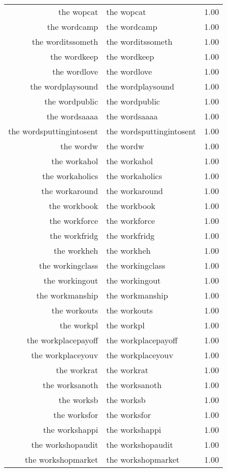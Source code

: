 \begin{table}[ht]
\begin{tabular}{rlr}
  the wopcat & the wopcat & 1.00 \\ 
  the wordcamp & the wordcamp & 1.00 \\ 
  the worditssometh & the worditssometh & 1.00 \\ 
  the wordkeep & the wordkeep & 1.00 \\ 
  the wordlove & the wordlove & 1.00 \\ 
  the wordplaysound & the wordplaysound & 1.00 \\ 
  the wordpublic & the wordpublic & 1.00 \\ 
  the wordsaaaa & the wordsaaaa & 1.00 \\ 
  the wordsputtingintosent & the wordsputtingintosent & 1.00 \\ 
  the wordw & the wordw & 1.00 \\ 
  the workahol & the workahol & 1.00 \\ 
  the workaholics & the workaholics & 1.00 \\ 
  the workaround & the workaround & 1.00 \\ 
  the workbook & the workbook & 1.00 \\ 
  the workforce & the workforce & 1.00 \\ 
  the workfridg & the workfridg & 1.00 \\ 
  the workheh & the workheh & 1.00 \\ 
  the workingclass & the workingclass & 1.00 \\ 
  the workingout & the workingout & 1.00 \\ 
  the workmanship & the workmanship & 1.00 \\ 
  the workouts & the workouts & 1.00 \\ 
  the workpl & the workpl & 1.00 \\ 
  the workplacepayoff & the workplacepayoff & 1.00 \\ 
  the workplaceyouv & the workplaceyouv & 1.00 \\ 
  the workrat & the workrat & 1.00 \\ 
  the worksanoth & the worksanoth & 1.00 \\ 
  the worksb & the worksb & 1.00 \\ 
  the worksfor & the worksfor & 1.00 \\ 
  the workshappi & the workshappi & 1.00 \\ 
  the workshopaudit & the workshopaudit & 1.00 \\ 
  the workshopmarket & the workshopmarket & 1.00 \\ 

\end{tabular}
\end{table}
